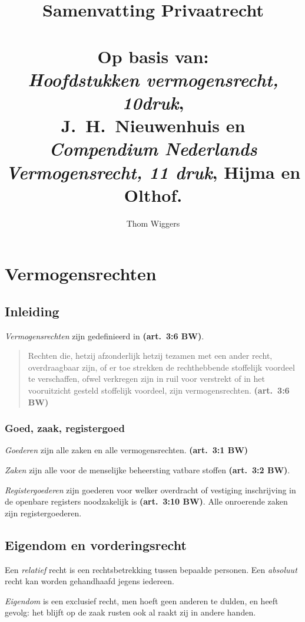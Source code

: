 \documentclass[a4paper]{article}
\author{Thom Wiggers}
\title{{\Huge Samenvatting Privaatrecht}\\\ \\ Op basis van: \\
\emph{Hoofdstukken vermogensrecht, 10\de druk}, \\
{\large J.~H.~Nieuwenhuis} en \emph{Compendium Nederlands Vermogensrecht, 11\de
druk}, {\large{Hijma en Olthof.}}}
\newcommand{\art}[1]{\textbf{(art.~#1 BW)}\xspace}
\begin{document}
 \maketitle

\section{Vermogensrechten}

\subsection{Inleiding}

\emph{Vermogensrechten} zijn gedefinieerd in \art{3:6}.

\begin{quote}

  Rechten die, hetzij afzonderlijk hetzij tezamen met een ander recht,
  overdraagbaar zijn, of er toe strekken de rechthebbende stoffelijk voordeel
  te verschaffen, ofwel verkregen zijn in ruil voor verstrekt of in het
  vooruitzicht gesteld stoffelijk voordeel, zijn vermogensrechten. \art{3:6}

\end{quote}

\subsubsection{Goed, zaak, registergoed}

\emph{Goederen} zijn alle zaken en alle vermogensrechten. \art{3:1}

\emph{Zaken} zijn alle voor de menselijke beheersting vatbare stoffen
\art{3:2}.

\emph{Registergoederen} zijn goederen voor welker overdracht of vestiging
inschrijving in de openbare registers noodzakelijk is \art{3:10}. Alle
onroerende zaken zijn registergoederen.

\subsection{Eigendom en vorderingsrecht}

Een \emph{relatief} recht is een rechtsbetrekking tussen bepaalde personen.
Een \emph{absoluut} recht kan worden gehandhaafd jegens iedereen.

\emph{Eigendom} is een exclusief recht, men hoeft geen anderen te dulden, en
heeft gevolg: het blijft op de zaak rusten ook al raakt zij in andere handen.
\end{document}
